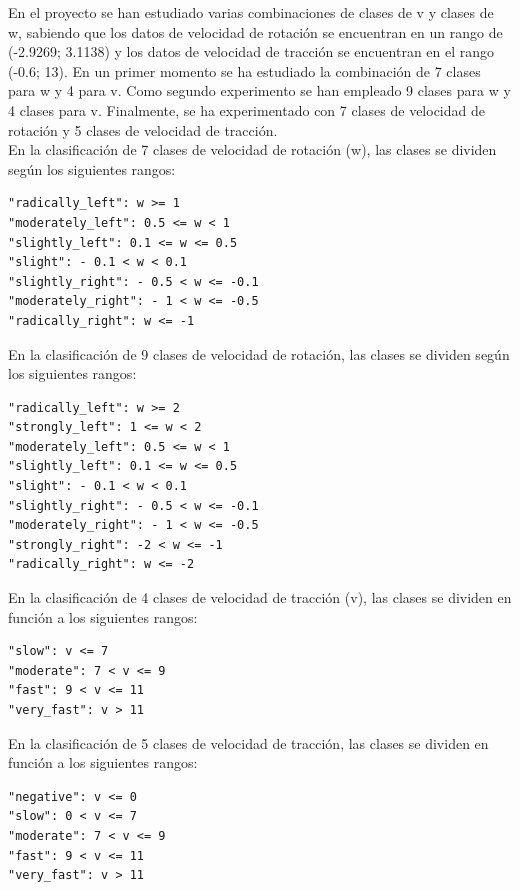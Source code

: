 En el proyecto se han estudiado varias combinaciones de clases de v y clases de w, sabiendo que los datos de velocidad de rotación se encuentran en un rango de (-2.9269; 3.1138) y los datos de velocidad de tracción se encuentran en el rango (-0.6; 13). En un primer momento se ha estudiado la combinación de 7 clases para w y 4 para v. Como segundo experimento se han empleado 9 clases para w y 4 clases para v. Finalmente, se ha experimentado con 7 clases de velocidad de rotación y 5 clases de velocidad de tracción.\\

En la clasificación de 7 clases de velocidad de rotación (w), las clases se dividen según los siguientes rangos:

\vspace{10pt}
\begin{lstlisting}
"radically_left": w >= 1
"moderately_left": 0.5 <= w < 1
"slightly_left": 0.1 <= w <= 0.5
"slight": - 0.1 < w < 0.1
"slightly_right": - 0.5 < w <= -0.1
"moderately_right": - 1 < w <= -0.5
"radically_right": w <= -1
\end{lstlisting}
\vspace{20pt}


En la clasificación de 9 clases de velocidad de rotación, las clases se dividen según los siguientes rangos:

\vspace{10pt}
\begin{lstlisting}
"radically_left": w >= 2
"strongly_left": 1 <= w < 2
"moderately_left": 0.5 <= w < 1
"slightly_left": 0.1 <= w <= 0.5
"slight": - 0.1 < w < 0.1
"slightly_right": - 0.5 < w <= -0.1
"moderately_right": - 1 < w <= -0.5
"strongly_right": -2 < w <= -1
"radically_right": w <= -2
\end{lstlisting}
\vspace{20pt}


En la clasificación de 4 clases de velocidad de tracción (v), las clases se dividen en función a los siguientes rangos:

\vspace{10pt}
\begin{lstlisting}
"slow": v <= 7
"moderate": 7 < v <= 9
"fast": 9 < v <= 11
"very_fast": v > 11
\end{lstlisting}
\vspace{20pt}

En la clasificación de 5 clases de velocidad de tracción, las clases se dividen en función a los siguientes rangos:

\vspace{10pt}
\begin{lstlisting}
"negative": v <= 0
"slow": 0 < v <= 7
"moderate": 7 < v <= 9
"fast": 9 < v <= 11
"very_fast": v > 11
\end{lstlisting}
\vspace{20pt}


